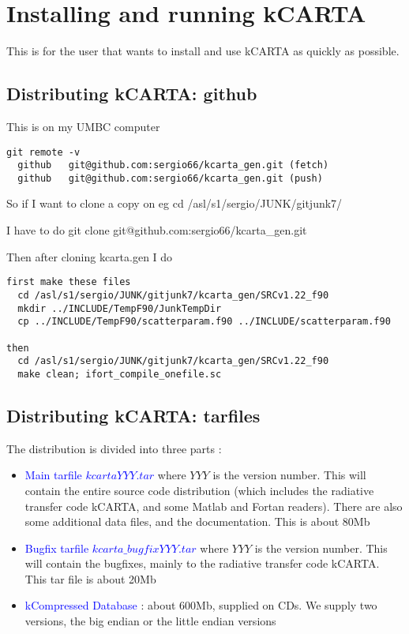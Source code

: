 \documentclass[12pt]{article}
\newcommand{\kc}{\textsf{kCARTA}\xspace}
\begin{document}
\section{Installing and running \kc}
This is for the user that wants to install and use \kc as quickly as possible. 

\subsection{Distributing \kc : github}

This is on my UMBC computer
\begin{verbatim}
git remote -v
  github   git@github.com:sergio66/kcarta_gen.git (fetch)
  github   git@github.com:sergio66/kcarta_gen.git (push)
\end{verbatim}

So if I want to clone a copy on eg \newline
  cd /asl/s1/sergio/JUNK/gitjunk7/ 

I have to do \newline
  git clone git@github.com:sergio66/kcarta\_gen.git

Then after cloning kcarta.gen I do \newline
\begin{verbatim}
first make these files
  cd /asl/s1/sergio/JUNK/gitjunk7/kcarta_gen/SRCv1.22_f90
  mkdir ../INCLUDE/TempF90/JunkTempDir
  cp ../INCLUDE/TempF90/scatterparam.f90 ../INCLUDE/scatterparam.f90 

then
  cd /asl/s1/sergio/JUNK/gitjunk7/kcarta_gen/SRCv1.22_f90
  make clean; ifort_compile_onefile.sc
\end{verbatim}

\subsection{Distributing \kc : tarfiles}
The distribution is divided into three parts :

\begin{itemize}
\item \textcolor{blue} {Main tarfile $kcartaYYY.tar$} where $YYY$ is the 
version number. This will contain the entire source code distribution (which 
includes the radiative transfer code \kc, and some Matlab and Fortan readers).
There are also some additional data files, and the documentation. This is 
about 80Mb\\
\item \textcolor{blue} {Bugfix tarfile $kcarta\_bugfixYYY.tar$} where $YYY$ 
is the version number.
This will contain the bugfixes, mainly to the radiative transfer code \kc. This
tar file is about 20Mb \\
\item \textcolor{blue} {kCompressed Database} : about 600Mb, supplied on CDs. 
We supply two versions, the big endian or the little endian versions \\
\end{itemize}
\end{document}
